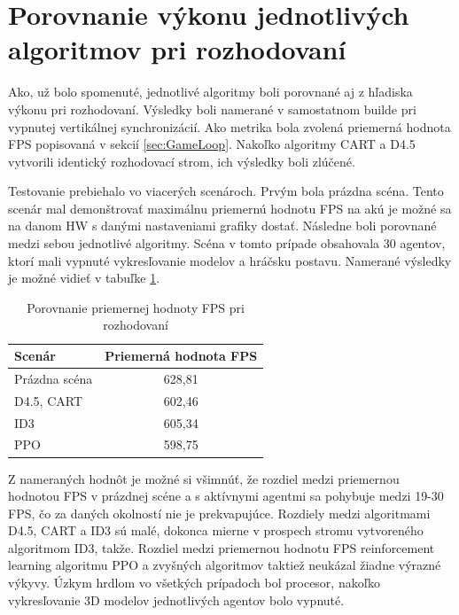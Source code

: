 \documentclass[slovak, master]{diploma}
\begin{document}
\section{Porovnanie výkonu jednotlivých algoritmov pri rozhodovaní}
\label{sec:editorPerformance}
Ako, už bolo spomenuté, jednotlivé algoritmy boli porovnané aj z hľadiska výkonu pri rozhodovaní. Výsledky boli namerané v samostatnom builde pri vypnutej vertikálnej synchronizácií. Ako metrika bola zvolená priemerná hodnota FPS popisovaná v sekcií \ref{sec:GameLoop}. Nakoľko algoritmy CART a D4.5 vytvorili identický rozhodovací strom, ich výsledky boli zlúčené. 

Testovanie prebiehalo vo viacerých scenároch. Prvým bola prázdna scéna. Tento scenár mal demonštrovať maximálnu priemernú hodnotu FPS na akú je možné sa na danom HW s danými nastaveniami grafiky dostať. Následne boli porovnané medzi sebou jednotlivé algoritmy. Scéna v tomto prípade obsahovala 30 agentov, ktorí mali vypnuté vykresľovanie modelov a hráčsku postavu. Namerané výsledky je možné vidieť v tabuľke \ref{tab:benchmarksGame}.

\begin{table}[!ht]
    \centering
    \begin{tabular}{|l|c|}
    \hline
        \textbf{Scenár} & \textbf{Priemerná hodnota FPS} \\ \hline
        Prázdna scéna & 628,81 \\ 
        D4.5, CART & 602,46 \\ 
        ID3 & 605,34 \\ 
        PPO & 598,75 \\ \hline
    \end{tabular}
    \caption{Porovnanie priemernej hodnoty FPS pri rozhodovaní}
    \label{tab:benchmarksGame}
\end{table}

Z nameraných hodnôt je možné si všimnúť, že rozdiel medzi priemernou hodnotou FPS v prázdnej scéne a s aktívnymi agentmi sa pohybuje medzi 19-30 FPS, čo za daných okolností nie je prekvapujúce. Rozdiely medzi algoritmami D4.5, CART a ID3 sú malé, dokonca mierne v prospech stromu vytvoreného algoritmom ID3, takže. Rozdiel medzi priemernou hodnotu FPS reinforcement learning algoritmu PPO a zvyšných algoritmov taktiež neukázal žiadne výrazné výkyvy. Úzkym hrdlom vo všetkých prípadoch bol procesor, nakoľko vykresľovanie 3D modelov jednotlivých agentov bolo vypnuté. 
\end{document}

